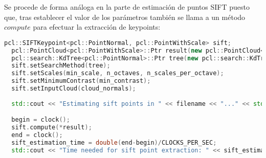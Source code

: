 Se procede de forma análoga en la parte de estimación de puntos SIFT puesto que, tras establecer el valor de los parámetros también se llama a un método $compute$ para efectuar la extracción de keypoints:

\begin{lstlisting}[language=C++,breaklines]
  pcl::SIFTKeypoint<pcl::PointNormal, pcl::PointWithScale> sift;
  pcl::PointCloud<pcl::PointWithScale>::Ptr result(new pcl::PointCloud<pcl::PointWithScale>);
  pcl::search::KdTree<pcl::PointNormal>::Ptr tree(new pcl::search::KdTree<pcl::PointNormal> ());
  sift.setSearchMethod(tree);
  sift.setScales(min_scale, n_octaves, n_scales_per_octave);
  sift.setMinimumContrast(min_contrast);
  sift.setInputCloud(cloud_normals);
 
  std::cout << "Estimating sift points in " << filename << "..." << std::endl;

  begin = clock();
  sift.compute(*result);
  end = clock();
  sift_estimation_time = double(end-begin)/CLOCKS_PER_SEC;
  std::cout << "Time needed for sift point extraction: " << sift_estimation_time << " seconds" << std::endl << std::endl;
\end{lstlisting}

